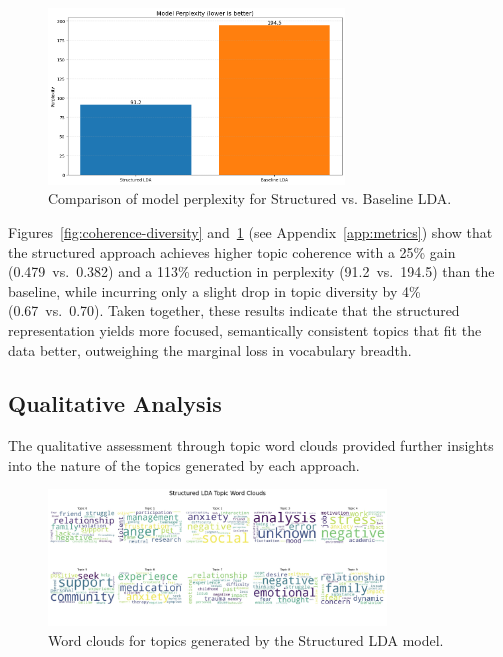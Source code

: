 \documentclass{article}
\begin{document}
\begin{figure}[ht]
    \centering
    \includegraphics[width=0.7\textwidth]{plots/perplexity_plot.png}
    \caption{Comparison of model perplexity for Structured vs. Baseline LDA.}
    \label{fig:perplexity}
\end{figure}

\noindent
Figures~\ref{fig:coherence-diversity} and~\ref{fig:perplexity} (see Appendix~\ref{app:metrics}) show that the structured approach achieves higher topic coherence with a 25\% gain (0.479~vs.\ 0.382) and a 113\% reduction in perplexity (91.2~vs.\ 194.5) than the baseline, while incurring only a slight drop in topic diversity by 4\% (0.67~vs.\ 0.70). Taken together, these results indicate that the structured representation yields more focused, semantically consistent topics that fit the data better, outweighing the marginal loss in vocabulary breadth.



\subsection{Qualitative Analysis}
The qualitative assessment through topic word clouds provided further insights into the nature of the topics generated by each approach.

\begin{figure}[ht]
    \centering
    \includegraphics[width=0.8\textwidth]{plots/structuredLDATopicWordClouds.jpeg}
    \caption{Word clouds for topics generated by the Structured LDA model.}
    \label{fig:wordcloud-structured}
\end{figure}
\end{document}
